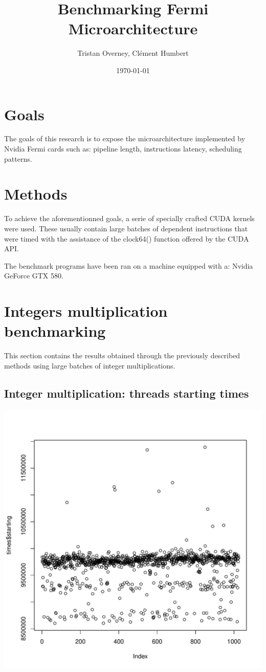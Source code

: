 \documentclass{article}
\begin{document}
\title{Benchmarking Fermi Microarchitecture}
\author{Tristan Overney, Cl\'{e}ment Humbert}
\date{\today}
\maketitle

\section{Goals}
	The goals of this research is to expose the microarchitecture implemented by
	Nvidia Fermi cards such as: pipeline length, instructions latency, scheduling
	patterns.

\section{Methods}
	To achieve the aforementionned goals, a serie of specially crafted CUDA kernels
	were used. These usually contain large batches of dependent instructions that were 
	timed with the assistance of the clock64() function offered by the CUDA API.

	The benchmark programs have been ran on a machine equipped with a: 
	Nvidia GeForce GTX 580.

\section{Integers multiplication benchmarking}
	This section contains the results obtained through the previously described
	methods using large batches of integer multiplications.

	\subsection{Integer multiplication: threads starting times}
	\includegraphics[width=\linewidth]{"starting_times"}
	\pagebreak
\end{document}
